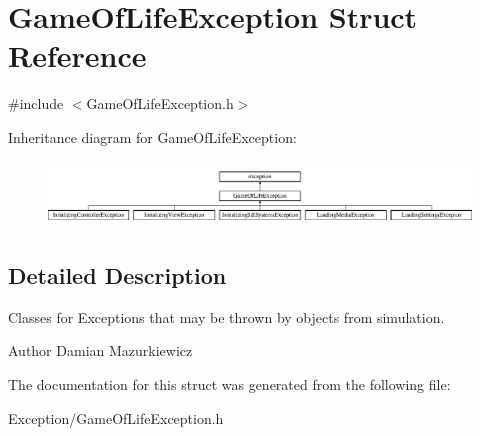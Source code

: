 \hypertarget{struct_game_of_life_exception}{}\section{Game\+Of\+Life\+Exception Struct Reference}
\label{struct_game_of_life_exception}


{\ttfamily \#include $<$Game\+Of\+Life\+Exception.\+h$>$}

Inheritance diagram for Game\+Of\+Life\+Exception\+:\begin{figure}[H]
\begin{center}
\leavevmode
\includegraphics[height=1.731959cm]{struct_game_of_life_exception}
\end{center}
\end{figure}


\subsection{Detailed Description}
Classes for Exceptions that may be thrown by objects from simulation. \begin{DoxyAuthor}{Author}
Damian Mazurkiewicz 
\end{DoxyAuthor}


The documentation for this struct was generated from the following file\+:\begin{DoxyCompactItemize}
\item 
Exception/Game\+Of\+Life\+Exception.\+h\end{DoxyCompactItemize}

